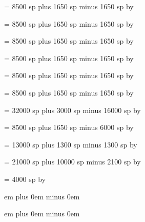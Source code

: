 \newskip\spaceaftersmallbar
\spaceaftersmallbar = 8500 sp plus 1650 sp minus 1650 sp
\multiply\spaceaftersmallbar by \factor

\newskip\spacebeforeminor
\spacebeforeminor = 8500 sp plus 1650 sp minus 1650 sp
\multiply\spacebeforeminor by \factor

\newskip\spaceafterminor
\spaceafterminor = 8500 sp plus 1650 sp minus 1650 sp
\multiply\spaceafterminor by \factor

\newskip\spacebeforemaior
\spacebeforemaior = 8500 sp plus 1650 sp minus 1650 sp
\multiply\spacebeforemaior by \factor

\newskip\spaceaftermaior
\spaceaftermaior = 8500 sp plus 1650 sp minus 1650 sp
\multiply\spaceaftermaior by \factor

\newskip\spacebeforefinalis
\spacebeforefinalis = 8500 sp plus 1650 sp minus 1650 sp
\multiply\spacebeforefinalis by \factor

\newskip\spacebeforefinalfinalis
\spacebeforefinalfinalis= 32000 sp plus 3000 sp minus 16000 sp
\multiply\spacebeforefinalfinalis by \factor

\newskip\spaceafterfinalis
\spaceafterfinalis = 8500 sp plus 1650 sp minus 6000 sp
\multiply\spaceafterfinalis by \factor

\newskip\textbartextspace
\textbartextspace = 13000 sp plus 1300 sp minus 1300 sp
\multiply\textbartextspace by \factor

\newskip\notebarspace
\notebarspace = 21000 sp plus 10000 sp minus 2100 sp
\multiply\notebarspace by \factor

\newdimen\maximumspacewithoutdash
\maximumspacewithoutdash = 4000 sp
\multiply\maximumspacewithoutdash by \factor

\newskip\afterinitialshift
{} em plus 0em minus 0em

\newskip\beforeinitialshift
{} em plus 0em minus 0em

\def\setspaceafterinitial#1{%
\afterinitialshift=#1 %
\relax %
}

\def\setspacebeforeinitial#1{%
\beforeinitialshift=#1 %
\relax %
}

\newskip\clefchangespace

